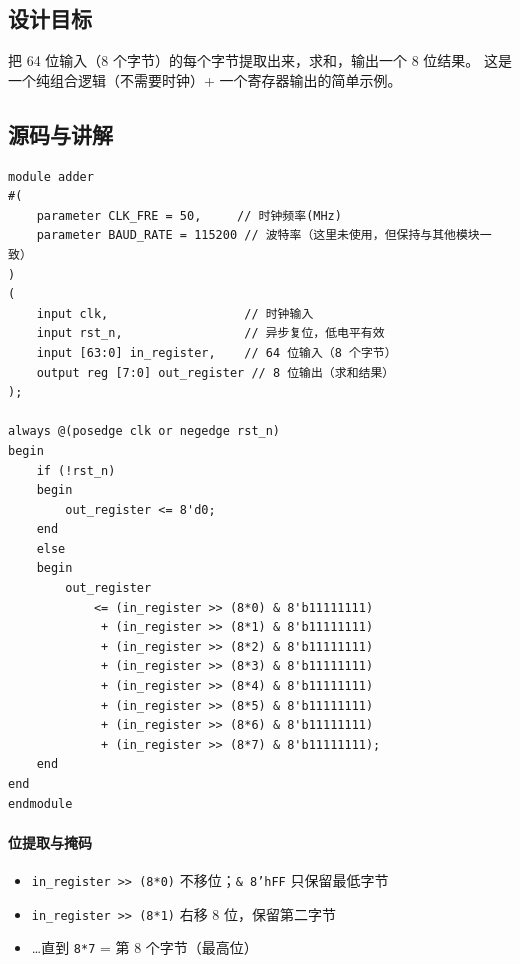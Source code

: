\subsection{设计目标}

把 64 位输入（8 个字节）的每个字节提取出来，求和，输出一个 8 位结果。
这是一个纯组合逻辑（不需要时钟）+ 一个寄存器输出的简单示例。

\subsection{源码与讲解}

\begin{lstlisting}[style=verilog,caption=Chip/src/adder.v]
module adder
#(
    parameter CLK_FRE = 50,     // 时钟频率(MHz)
    parameter BAUD_RATE = 115200 // 波特率（这里未使用，但保持与其他模块一致）
)
(
    input clk,                   // 时钟输入
    input rst_n,                 // 异步复位，低电平有效
    input [63:0] in_register,    // 64 位输入（8 个字节）
    output reg [7:0] out_register // 8 位输出（求和结果）
);

always @(posedge clk or negedge rst_n)
begin
    if (!rst_n)
    begin
        out_register <= 8'd0;
    end
    else
    begin
        out_register
            <= (in_register >> (8*0) & 8'b11111111)
             + (in_register >> (8*1) & 8'b11111111)
             + (in_register >> (8*2) & 8'b11111111)
             + (in_register >> (8*3) & 8'b11111111)
             + (in_register >> (8*4) & 8'b11111111)
             + (in_register >> (8*5) & 8'b11111111)
             + (in_register >> (8*6) & 8'b11111111)
             + (in_register >> (8*7) & 8'b11111111);
    end
end
endmodule
\end{lstlisting}

\paragraph{位提取与掩码}
\begin{itemize}
    \item \texttt{in\_register >> (8*0)} 不移位；\texttt{\& 8'hFF} 只保留最低字节
    \item \texttt{in\_register >> (8*1)} 右移 8 位，保留第二字节
    \item \ldots 直到 \texttt{8*7} = 第 8 个字节（最高位）
\end{itemize}

